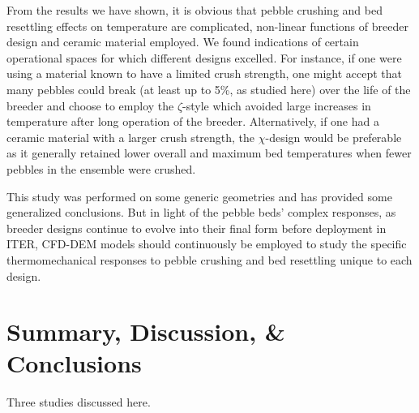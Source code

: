 From the results we have shown, it is obvious that pebble crushing and bed resettling effects on temperature are complicated, non-linear functions of breeder design and ceramic material employed. We found indications of certain operational spaces for which different designs excelled. For instance, if one were using a material known to have a limited crush strength, one might accept that many pebbles could break (at least up to 5\%, as studied here) over the life of the breeder and choose to employ the $\zeta$-style which avoided large increases in temperature after long operation of the breeder. Alternatively, if one had a ceramic material with a larger crush strength, the $\chi$-design would be preferable as it generally retained lower overall and maximum bed temperatures when fewer pebbles in the ensemble were crushed.

This study was performed on some generic geometries and has provided some generalized conclusions. But in light of the pebble beds' complex responses, as breeder designs continue to evolve into their final form before deployment in ITER, CFD-DEM models should continuously be employed to study the specific thermomechanical responses to pebble crushing and bed resettling unique to each design.









\section{Summary, Discussion, \& Conclusions}

Three studies discussed here.